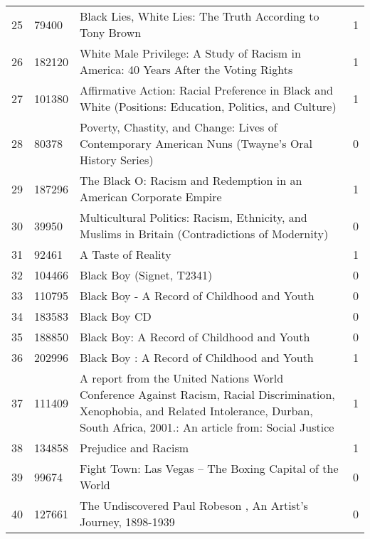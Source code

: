 \begin{tabular}{llll}
25 & 79400 & Black Lies, White Lies: The Truth According to Tony Brown & 1 \\
26 & 182120 & White Male Privilege: A Study of Racism in America: 40 Years After the Voting Rights & 1 \\
27 & 101380 & Affirmative Action: Racial Preference in Black and White (Positions: Education, Politics, and Culture) & 1 \\
28 & 80378 & Poverty, Chastity, and Change: Lives of Contemporary American Nuns (Twayne's Oral History Series) & 0 \\
29 & 187296 & The Black O: Racism and Redemption in an American Corporate Empire & 1 \\
30 & 39950 & Multicultural Politics: Racism, Ethnicity, and Muslims in Britain (Contradictions of Modernity) & 0 \\
31 & 92461 & A Taste of Reality & 1 \\
32 & 104466 & Black Boy (Signet, T2341) & 0 \\
33 & 110795 & Black Boy - A Record of Childhood and Youth & 0 \\
34 & 183583 & Black Boy CD & 0 \\
35 & 188850 & Black Boy: A Record of Childhood and Youth & 0 \\
36 & 202996 & Black Boy : A Record of Childhood and Youth & 1 \\
37 & 111409 & A report from the United Nations World Conference Against Racism, Racial Discrimination, Xenophobia, and Related Intolerance, Durban, South Africa, 2001.: An article from: Social Justice & 1 \\
38 & 134858 & Prejudice and Racism & 1 \\
39 & 99674 & Fight Town: Las Vegas -- The Boxing Capital of the World & 0 \\
40 & 127661 & The Undiscovered Paul Robeson , An Artist's Journey, 1898-1939 & 0 \\
\bottomrule
\end{tabular}

